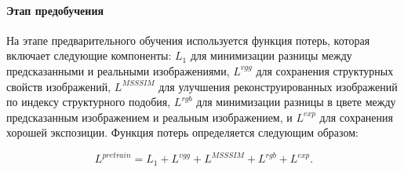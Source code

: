 \paragraph{Этап предобучения}

На этапе предварительного обучения используется функция потерь, которая включает следующие компоненты: $L_1$ для минимизации разницы между предсказанными и реальными изображениями, $L^{vgg}$ для сохранения структурных свойств изображений, $L^{MSSSIM}$ для улучшения реконструированных изображений по индексу структурного подобия, $L^{rgb}$ для минимизации разницы в цвете между предсказанным изображением и реальным изображением, и $L^{exp}$ для сохранения хорошей экспозиции. Функция потерь определяется следующим образом:

\begin{equation}
    \label{eq:2-1-3-6}
    L^{pretrain} = L_1 + L^{vgg} + L^{MSSSIM} + L^{rgb} + L^{exp}.
\end{equation}
